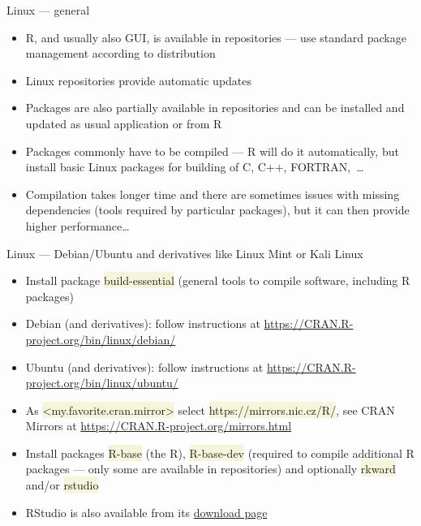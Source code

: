 \documentclass[compress, ucs, xelatex, 11pt, xcolor=svgnames, aspectratio=169,
	hyperref={
		bookmarks=true,
		unicode=true,
		colorlinks=true,
		pdftitle={Molecular data in R},
		plainpages=false,
		pdfauthor={Vojtech Zeisek},
		pdfsubject={Course about phylogeny and evolution in R},
		pdfcreator={XeLaTeX},
		pdfkeywords={R, evolution, phylogeny, molecular data},
		linkcolor=Crimson, %
		anchorcolor=Magenta, %
		citecolor=Magenta, %
		filecolor=Magenta, %
		menucolor=Magenta, %
		urlcolor=DodgerBlue, %
		pdftex},
	url={hyphens, lowtilde} %
	]{beamer}
\renewcommand{\texttt}[1]{\colorbox{Beige}{{\ttfamily #1}}}
\begin{document}
\begin{frame}{Linux --- general}
	\begin{itemize}
		\item R, and usually also GUI, is available in repositories --- use standard package management according to distribution
		\item Linux repositories provide automatic updates
		\item Packages are also partially available in repositories and can be installed and updated as usual application or from R
		\item Packages commonly have to be compiled --- R will do it automatically, but install basic Linux packages for building of C, C++, FORTRAN,~\ldots
		\item Compilation takes longer time and there are sometimes issues with missing dependencies (tools required by particular packages), but it can then provide higher performance\ldots
	\end{itemize}
\end{frame}

\begin{frame}{Linux --- Debian/Ubuntu and derivatives like Linux Mint or Kali Linux}
	\begin{itemize}
		\item Install package \texttt{build-essential} (general tools to compile software, including R packages)
		\item Debian (and derivatives): follow instructions at \url{https://CRAN.R-project.org/bin/linux/debian/}
		\item Ubuntu (and derivatives): follow instructions at \url{https://CRAN.R-project.org/bin/linux/ubuntu/}
		\item As \texttt{<my.favorite.cran.mirror>} select \alert{\texttt{https://mirrors.nic.cz/R/}}, see \alert{CRAN Mirrors} at \url{https://CRAN.R-project.org/mirrors.html}
		\item Install packages \texttt{R-base} (the R), \texttt{R-base-dev} (required to compile additional R packages --- only some are available in repositories) and optionally \texttt{rkward} and/or \texttt{rstudio}
		\item RStudio is also available from its \href{https://rstudio.com/products/rstudio/download/\#download}{download page}
	\end{itemize}
\end{frame}
\end{document}
